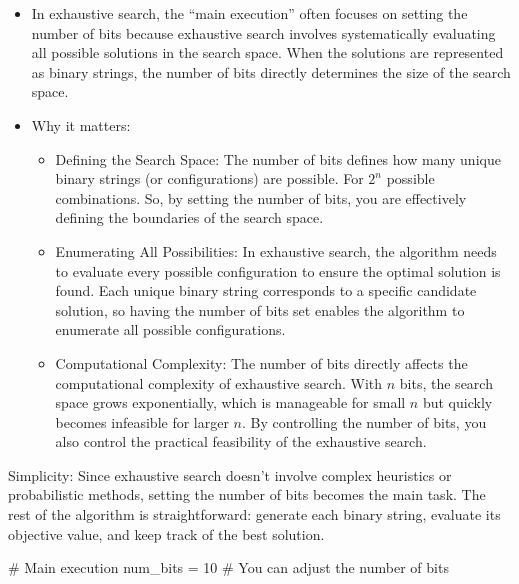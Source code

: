 \documentclass[
  letterpaper,
  DIV=11,
  numbers=noendperiod]{scrreprt}
\newenvironment{Shaded}{\begin{snugshade}}{\end{snugshade}}
\newcommand{\CommentTok}[1]{\textcolor[rgb]{0.37,0.37,0.37}{#1}}
\newcommand{\DecValTok}[1]{\textcolor[rgb]{0.68,0.00,0.00}{#1}}
\newcommand{\NormalTok}[1]{\textcolor[rgb]{0.00,0.23,0.31}{#1}}
\newcommand{\OperatorTok}[1]{\textcolor[rgb]{0.37,0.37,0.37}{#1}}
\providecommand{\tightlist}{%
  \setlength{\itemsep}{0pt}\setlength{\parskip}{0pt}}\usepackage{longtable,booktabs,array}
\begin{document}
\begin{itemize}
\tightlist
\item
  In exhaustive search, the ``main execution'' often focuses on setting
  the number of bits because exhaustive search involves systematically
  evaluating all possible solutions in the search space. When the
  solutions are represented as binary strings, the number of bits
  directly determines the size of the search space.
\item
  Why it matters:

  \begin{itemize}
  \tightlist
  \item
    Defining the Search Space: The number of bits defines how many
    unique binary strings (or configurations) are possible. For \(2^n\)
    possible combinations. So, by setting the number of bits, you are
    effectively defining the boundaries of the search space.
  \item
    Enumerating All Possibilities: In exhaustive search, the algorithm
    needs to evaluate every possible configuration to ensure the optimal
    solution is found. Each unique binary string corresponds to a
    specific candidate solution, so having the number of bits set
    enables the algorithm to enumerate all possible configurations.
  \item
    Computational Complexity: The number of bits directly affects the
    computational complexity of exhaustive search. With \(n\) bits, the
    search space grows exponentially, which is manageable for small
    \(n\) but quickly becomes infeasible for larger \(n\). By
    controlling the number of bits, you also control the practical
    feasibility of the exhaustive search.
  \end{itemize}
\end{itemize}

Simplicity: Since exhaustive search doesn't involve complex heuristics
or probabilistic methods, setting the number of bits becomes the main
task. The rest of the algorithm is straightforward: generate each binary
string, evaluate its objective value, and keep track of the best
solution.

\begin{Shaded}
\begin{Highlighting}[]
\CommentTok{\# Main execution}
\NormalTok{num\_bits }\OperatorTok{=} \DecValTok{10}  \CommentTok{\# You can adjust the number of bits}
\end{Highlighting}
\end{Shaded}
\end{document}
